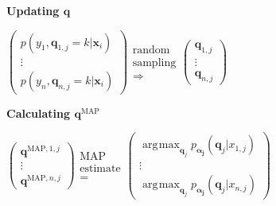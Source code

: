 \documentclass[english,xcolor={rgb,dvipsnames,table,usenames}]{beamer}
\DeclareMathOperator*{\argmax}{\arg\!\max}
\newcommand\q{{\bm{q}}}
\begin{document}
\begin{frame}
\medskip

\textbf{Updating $\q$}

\medskip

$\left( \begin{array}{c}
p(y_1,\q_{1,j}=k|\bm{x}_i)  \\
\vdots \\
p(y_n,\q_{n,j}=k|\bm{x}_i) \end{array} \right)
\begin{array}{c}
\text{random} \\
\text{sampling} \\
\Rightarrow \end{array}
\left( \begin{array}{ccc}
\q_{1,j}  \\
 \vdots \\
 \q_{n,j} \end{array} \right)$

\medskip

\textbf{Calculating $\q^{\text{MAP}}$}

\medskip

$\left( \begin{array}{c}
\q^{\text{MAP},1,j}  \\
\vdots \\
\q^{\text{MAP},n,j} \end{array} \right)
\begin{array}{c}
\text{MAP} \\
\text{estimate} \\
= \end{array}
\left( \begin{array}{ccc}
\argmax_{\q_j} p_{\bm{\alpha_j}}(\q_j | x_{1,j})  \\
 \vdots \\
\argmax_{\q_j} p_{\bm{\alpha_j}}(\q_j | x_{n,j}) \end{array} \right)$
 
 
\normalsize

\end{frame}






\begin{frame}
\frametitle{\secname}

\begin{figure}
\end{figure}

\end{frame}
\end{document}
